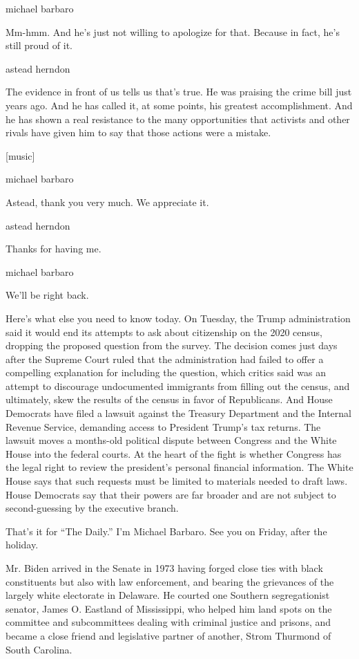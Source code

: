 michael barbaro

Mm-hmm. And he's just not willing to apologize for that. Because in
fact, he's still proud of it.

astead herndon

The evidence in front of us tells us that's true. He was praising the
crime bill just years ago. And he has called it, at some points, his
greatest accomplishment. And he has shown a real resistance to the many
opportunities that activists and other rivals have given him to say that
those actions were a mistake.

{[}music{]}

michael barbaro

Astead, thank you very much. We appreciate it.

astead herndon

Thanks for having me.

michael barbaro

We'll be right back.

Here's what else you need to know today. On Tuesday, the Trump
administration said it would end its attempts to ask about citizenship
on the 2020 census, dropping the proposed question from the survey. The
decision comes just days after the Supreme Court ruled that the
administration had failed to offer a compelling explanation for
including the question, which critics said was an attempt to discourage
undocumented immigrants from filling out the census, and ultimately,
skew the results of the census in favor of Republicans. And House
Democrats have filed a lawsuit against the Treasury Department and the
Internal Revenue Service, demanding access to President Trump's tax
returns. The lawsuit moves a months-old political dispute between
Congress and the White House into the federal courts. At the heart of
the fight is whether Congress has the legal right to review the
president's personal financial information. The White House says that
such requests must be limited to materials needed to draft laws. House
Democrats say that their powers are far broader and are not subject to
second-guessing by the executive branch.

That's it for ``The Daily.'' I'm Michael Barbaro. See you on Friday,
after the holiday.

Mr. Biden arrived in the Senate in 1973 having forged close ties with
black constituents but also with law enforcement, and bearing the
grievances of the largely white electorate in Delaware. He courted one
Southern segregationist senator, James O. Eastland of Mississippi, who
helped him land spots on the committee and subcommittees dealing with
criminal justice and prisons, and became a close friend and legislative
partner of another, Strom Thurmond of South Carolina.

